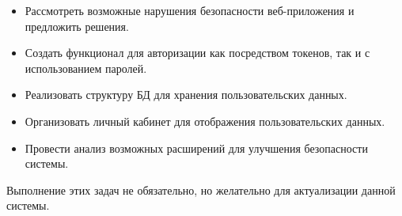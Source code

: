 \begin{itemize}

\item Рассмотреть возможные нарушения безопасности веб-приложения и предложить решения.

\item Создать функционал для авторизации как посредством токенов, так и с использованием паролей.

\item Реализовать структуру БД для хранения пользовательских данных.

\item Организовать личный кабинет для отображения пользовательских данных.

\item Провести анализ возможных расширений для улучшения безопасности системы.

\end{itemize}

Выполнение этих задач не обязательно, но желательно для актуализации данной системы.